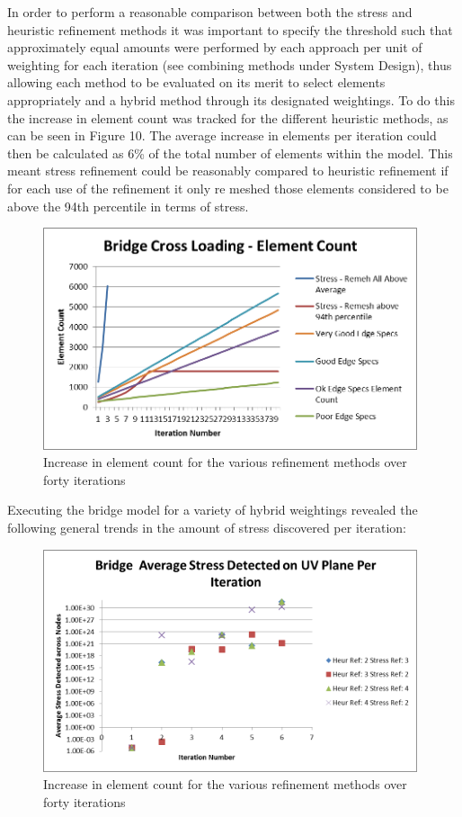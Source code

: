 \noindent
In order to perform a reasonable comparison between both the stress and heuristic refinement methods it was important to specify the threshold such that approximately equal amounts were performed by each approach per unit of weighting for each iteration (see combining methods under System Design), thus allowing each method to be evaluated on its merit to select elements appropriately and a hybrid method through its designated weightings. To do this the increase in element count was tracked for the different heuristic methods, as can be seen in Figure 10. The average increase in elements per iteration could then be calculated as 6\% of the total number of elements within the model. This meant stress refinement could be reasonably compared to heuristic refinement if for each use of the refinement it only re meshed those elements considered to be above the 94th percentile in terms of stress. \\ 


\begin{figure}[!h]
  \centerline{\includegraphics[width=110mm, scale=1]{../Graphics/Graphs/BridgeCrossLoadingElementCount.png}}
  \caption{Increase in element count for the various refinement methods over forty iterations}
  \label{fig:sub1}
\end{figure}

\noindent
Executing the bridge model for a variety of hybrid weightings revealed the following general trends in the amount of stress discovered per iteration:

\begin{figure}[!h]
  \centerline{\includegraphics[width=110mm, scale=1]{../Graphics/Graphs/BridgeCrossLoadingAverageStressRevealed.png}}
  \caption{Increase in element count for the various refinement methods over forty iterations}
  \label{fig:sub1}
\end{figure}



